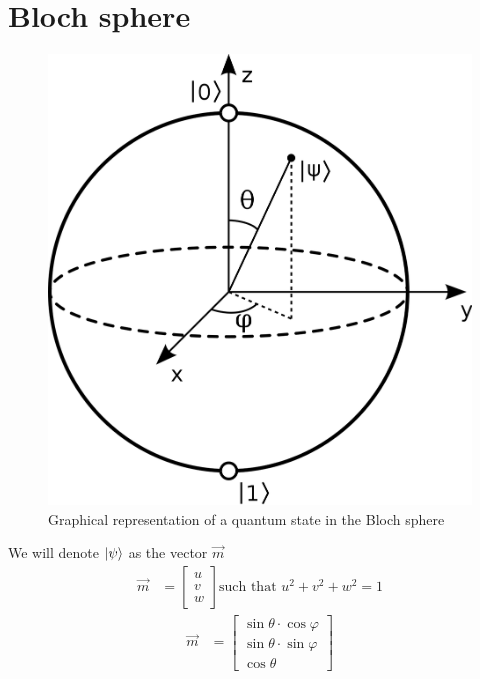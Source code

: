 \documentclass{article}
\begin{document}
\section{Bloch sphere}
\begin{figure}[h]
    \centering
    \includegraphics[scale=0.15]{bloch-sphere.png}
    \caption{Graphical representation of a quantum state in the Bloch sphere}
\end{figure}
\noindent
We will denote $\ket{\psi}$ as the vector $\vec{m}$
\begin{equation}
    \begin{aligned}
        \vec{m} & = \begin{bmatrix}
            u \\ v \\ w
        \end{bmatrix} \text{such that } u^2 + v^2 + w^2 = 1
    \end{aligned}
\end{equation}
\begin{equation}
    \begin{aligned}
        \vec{m} & =
        \begin{bmatrix}
            \label{def-vect-m}
            \sin \theta \cdot \cos \varphi \\
            \sin \theta \cdot \sin \varphi \\
            \cos \theta
        \end{bmatrix}
    \end{aligned}
\end{equation}
\end{document}

